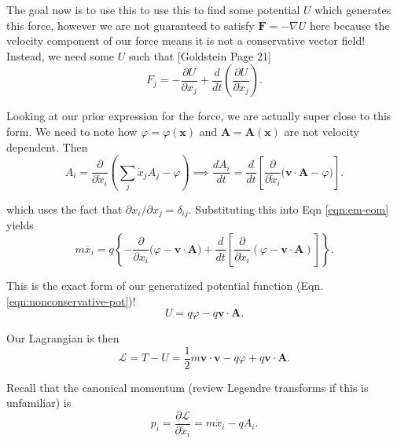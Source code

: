 \documentclass[12pt]{revtex4-2}
\begin{document}
The goal now is to use this to use this to find some potential $U$ which generates this force, however we are not guaranteed to satisfy $\mathbf{F} = -\nabla U$ here because the velocity component of our force means it is not a conservative vector field!  Instead, we need some $U$ such that [Goldstein Page 21]
\begin{equation}
    F_j = -\frac{\partial U}{\partial x_j} + \frac{d}{dt}\left( \frac{\partial U}{\partial \dot{x}_j} \right). \label{eqn:nonconservative-pot}
\end{equation}

Looking at our prior expression for the force, we are actually super close to this form.  We need to note how $\varphi = \varphi(\mathbf{x})$ and $\mathbf{A} = \mathbf{A}(\mathbf{x})$ are not velocity dependent.  Then
\begin{equation}
    A_i = \frac{\partial}{\partial \dot{x}_i}\left( \sum_j\dot{x}_j A_j - \varphi \right) \implies \frac{dA_i}{dt} = \frac{d}{dt}\left[ \frac{\partial}{\partial \dot{x}_i}\big( \mathbf{v}\cdot \mathbf{A} - \varphi \big) \right].
\end{equation}

which uses the fact that $\partial x_i/\partial x_j = \delta_{ij}$. Substituting this into Eqn \ref{eqn:em-eom} yields
\begin{equation}
    m\ddot{x_i} = q\left\{ -\frac{\partial}{\partial x_i}\big( \varphi - \mathbf{v}\cdot\mathbf{A} \big) + \frac{d}{dt}\left[ \frac{\partial}{\partial \dot{x}_i}\left( \varphi - \mathbf{v}\cdot\mathbf{A} \right) \right] \right\}.
\end{equation}

This is the exact form of our generatized potential function (Eqn. \ref{eqn:nonconservative-pot})!
\begin{equation}
    U = q\varphi - q\mathbf{v}\cdot\mathbf{A}.
\end{equation}

Our Lagrangian is then 
\begin{equation}\label{eqn:lagrangian}
    \mathcal{L} = T - U = \frac{1}{2}m \mathbf{v}\cdot\mathbf{v} - q\varphi + q\mathbf{v}\cdot\mathbf{A}.
\end{equation}

Recall that the canonical momentum (review Legendre transforms if this is unfamiliar) is
\begin{equation}
    p_i = \frac{\partial \mathcal{L}}{\partial \dot{x}_i} = m\dot{x}_i - qA_i.
\end{equation}
\end{document}
